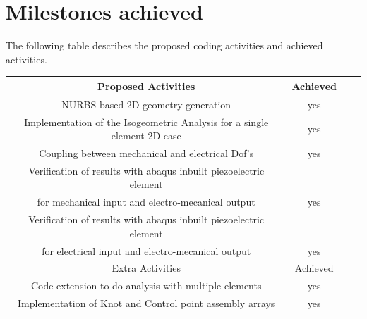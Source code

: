 \documentclass[11pt]{article}
\begin{document}
\section{Milestones achieved}
The following table describes the proposed coding activities and achieved activities.
\begin{center}
	\begin{tabular}{ |c|c|c|c| } 
		\hline
		Proposed Activities & Achieved \\
		\hline 
		NURBS based 2D geometry generation & yes \\
		Implementation of the Isogeometric Analysis for a single element 2D case & yes \\  
		Coupling between mechanical and electrical Dof’s & yes \\ 
		Verification of results with abaqus inbuilt piezoelectric element & \\
		for mechanical input and electro-mecanical output & yes \\ 
		Verification of results with abaqus inbuilt piezoelectric element & \\
		for electrical input and electro-mecanical output & yes \\ 
		\hline
		Extra Activities & Achieved \\
		\hline
		Code extension to do analysis with multiple elements & yes \\
		Implementation of Knot and Control point assembly arrays & yes \\
		\hline
	\end{tabular}
\end{center}
\end{document}
